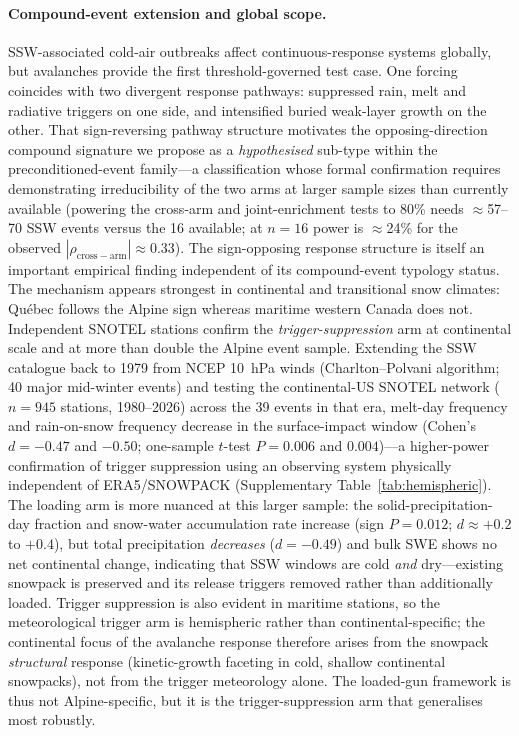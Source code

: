 \documentclass[11pt,letterpaper]{article}
\begin{document}
\paragraph{Compound-event extension and global scope.} SSW-associated cold-air outbreaks affect continuous-response systems globally\cite{Cohen2021,Gasparrini2015}, but avalanches provide the first threshold-governed test case. One forcing coincides with two divergent response pathways: suppressed rain, melt and radiative triggers on one side, and intensified buried weak-layer growth on the other. That sign-reversing pathway structure motivates the opposing-direction compound signature we propose as a \emph{hypothesised} sub-type within the preconditioned-event family\cite{Zscheischler2020}---a classification whose formal confirmation requires demonstrating irreducibility of the two arms at larger sample sizes than currently available (powering the cross-arm and joint-enrichment tests to 80\% needs $\approx$57--70 SSW events versus the 16 available; at $n = 16$ power is $\approx$24\% for the observed $|\rho_{\mathrm{cross-arm}}| \approx 0.33$). The sign-opposing response structure is itself an important empirical finding independent of its compound-event typology status. The mechanism appears strongest in continental and transitional snow climates: Qu\'ebec follows the Alpine sign whereas maritime western Canada does not. Independent SNOTEL stations confirm the \emph{trigger-suppression} arm at continental scale and at more than double the Alpine event sample. Extending the SSW catalogue back to 1979 from NCEP 10~hPa winds (Charlton--Polvani algorithm; 40 major mid-winter events) and testing the continental-US SNOTEL network ($n = 945$ stations, 1980--2026) across the 39 events in that era, melt-day frequency and rain-on-snow frequency decrease in the surface-impact window (Cohen's $d = -0.47$ and $-0.50$; one-sample $t$-test $P = 0.006$ and $0.004$)---a higher-power confirmation of trigger suppression using an observing system physically independent of ERA5/SNOWPACK (Supplementary Table~\ref{tab:hemispheric}). The loading arm is more nuanced at this larger sample: the solid-precipitation-day fraction and snow-water accumulation rate increase (sign $P = 0.012$; $d \approx +0.2$ to $+0.4$), but total precipitation \emph{decreases} ($d = -0.49$) and bulk SWE shows no net continental change, indicating that SSW windows are cold \emph{and} dry---existing snowpack is preserved and its release triggers removed rather than additionally loaded. Trigger suppression is also evident in maritime stations, so the meteorological trigger arm is hemispheric rather than continental-specific; the continental focus of the avalanche response therefore arises from the snowpack \emph{structural} response (kinetic-growth faceting in cold, shallow continental snowpacks), not from the trigger meteorology alone. The loaded-gun framework is thus not Alpine-specific, but it is the trigger-suppression arm that generalises most robustly.
\end{document}
